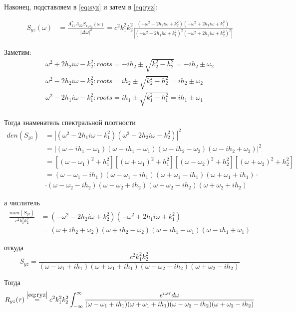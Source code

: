 \documentclass[a4paper,12pt]{article}
\begin{document}
Наконец, подставляем в \eqref{eq:syz} и затем в \eqref{eq:ryz}:

\begin{align*}
    S_{yz}(\omega) & =  \frac{A_{11}^* A_{22} S_{x_1 x_2}(\omega)}{|\Delta \omega|^2} = c^2 k_1^2 k_2^2 \frac{(- \omega^2 - 2 h_2 i \omega + k_2^2)(- \omega^2 + 2 h_1 i \omega + k_1^2)}{|(- \omega^2 + 2 h_1 i \omega + k_1^2)^2(- \omega^2 + 2 h_2 i \omega + k_2^2)^2|}
\end{align*}

Заметим:
\begin{gather*}
    \omega^2 + 2 h_2 i \omega - k_2^2: roots = -ih_2 \pm \sqrt{k_2^2-h_2^2} = -ih_2 \pm \omega_2 \\
    \omega^2 - 2 h_2 i \omega - k_2^2: roots = ih_2 \pm \sqrt{k_2^2-h_2^2} = ih_2 \pm \omega_2 \\
    \omega^2 - 2 h_1 i \omega - k_1^2: roots = ih_1 \pm \sqrt{k_1^2-h_1^2} = ih_1 \pm \omega_1 \\
\end{gather*}

Тогда знаменатель спектральной плотности
\begin{align*}
den(S_{yz}) &= |(\omega^2 - 2 h_1 i \omega - k_1^2)(\omega^2 - 2 h_2 i \omega - k_2^2)|^2 \\
&= |(\omega-ih_1-\omega_1)(\omega-ih_1+\omega_1)(\omega-ih_2-\omega_2)(\omega-ih_2+\omega_2)|^2 \\
&= [(\omega-\omega_1)^2+h_1^2][(\omega+\omega_1)^2+h_1^2][(\omega-\omega_2)^2+h_2^2][(\omega+\omega_2)^2+h_2^2] \\
&= (\omega-\omega_1-ih_1)(\omega-\omega_1+ih_1)(\omega+\omega_1-ih_1)(\omega+\omega_1+ih_1) \cdot \\
& \cdot (\omega-\omega_2-ih_2)(\omega-\omega_2+ih_2)(\omega+\omega_2-ih_2)(\omega+\omega_2+ih_2)
\end{align*}

а числитель
\begin{align*}
    \frac{num(S_{yz})}{c^2k_1^2k_2^2} &= (- \omega^2 - 2 h_2 i \omega + k_2^2)(- \omega^2 + 2 h_1 i \omega + k_1^2) \\
    &= (\omega+ih_2+\omega_2)(\omega+ih_2-\omega_2)(\omega-ih_1-\omega_1)(\omega-ih_1+\omega_1)
\end{align*}

откуда
\[ S_{yz} = \frac{c^2k_1^2k_2^2}{(\omega-\omega_1+ih_1)(\omega+\omega_1+ih_1)(\omega-\omega_2-ih_2)(\omega+\omega_2-ih_2)} \]

Тогда
\begin{equation}
    R_{yz}(\tau) \overset{\eqref{eq:ryz}}= c^2 k_1^2 k_2^2 \int_{-\infty}^\infty  \frac{e^{i\omega \tau} d \omega}{(\omega-\omega_1+ih_1)(\omega+\omega_1+ih_1)(\omega-\omega_2-ih_2)(\omega+\omega_2-ih_2)}  \label{eq:ryz_int}
\end{equation}
\end{document}
